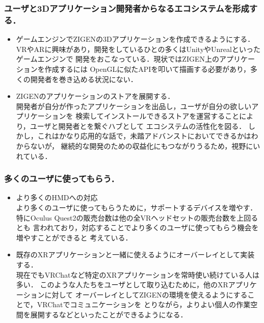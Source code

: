 \subsubsection*{ユーザと3Dアプリケーション開発者からなるエコシステムを形成する．}

\begin{itemize}
  \item ゲームエンジンでZIGENの3Dアプリケーションを作成できるようにする．\\
        VRやARに興味があり，開発をしているひとの多くはUnityやUnrealといったゲームエンジンで
        開発をおこなっている．現状ではZIGEN上のアプリケーションを作成するには
        OpenGLに似たAPIを叩いて描画する必要があり，多くの開発者を巻き込める状況にない．

  \item ZIGENのアプリケーションのストアを展開する．\\
        開発者が自分が作ったアプリケーションを出品し，ユーザが自分の欲しいアプリケーションを
        検索してインストールできるストアを運営することにより，ユーザと開発者とを繋ぐハブとして
        エコシステムの活性化を図る．
        しかし，これはかなり応用的な話で，未踏アドバンストにおいてできるかはわからないが，
        継続的な開発のための収益化にもつながりうるため，視野にいれている．
\end{itemize}

\subsubsection*{多くのユーザに使ってもらう．}

\begin{itemize}
  \item より多くのHMDへの対応\\
        より多くのユーザに使ってもらうために，サポートするデバイスを増やす．
        特にOculus Quest2の販売台数は他の全VRヘッドセットの販売台数を上回るとも
        言われており，対応することでより多くのユーザに使ってもらう機会を増やすことができると
        考えている．

  \item 既存のXRアプリケーションと一緒に使えるようにオーバーレイとして実装する．\\
        現在でもVRChatなど特定のXRアプリケーションを常時使い続けている人は多い．
        このような人たちをユーザとして取り込むために，他のXRアプリケーションに対して
        オーバーレイとしてZIGENの環境を使えるようにすることで，VRChatでコミュニケーションを
        とりながら，よりよい個人の作業空間を展開するなどといったことができるようになる．
\end{itemize}

